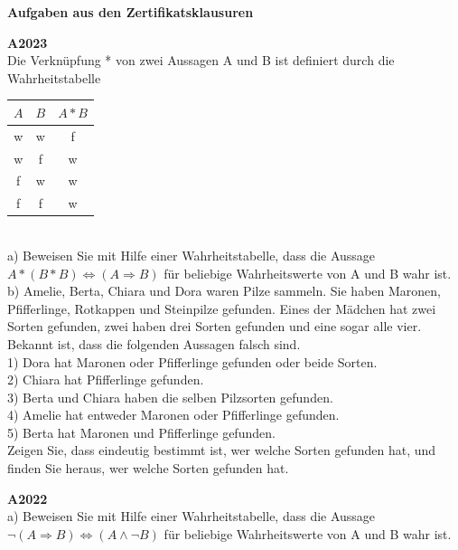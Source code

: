 \documentclass[landscape,twocolumn,a4paper]{article}
\begin{document}
\parindent 0mm

\textbf{Aufgaben aus den Zertifikatsklausuren}

\bigskip

\textbf{A2023} \\

Die Verknüpfung * von zwei Aussagen A und B ist definiert durch die Wahrheitstabelle \\

\begin{tabular}{|c|c|c|}
\hline $A$ & $B$ & $A * B$  \\
\hline w & w & f  \\
\hline w & f & w \\
\hline f & w & w \\
\hline f & f & w  \\
\hline
\end{tabular} \\

a) Beweisen Sie mit Hilfe einer Wahrheitstabelle, dass die Aussage $ A * (B * B) \Leftrightarrow (A \Rightarrow B)$ für beliebige Wahrheitswerte von A und B wahr ist. \\

b) Amelie, Berta, Chiara und Dora waren Pilze sammeln. Sie haben Maronen, Pfifferlinge, Rotkappen
und Steinpilze gefunden. Eines der Mädchen hat zwei Sorten gefunden, zwei haben
drei Sorten gefunden und eine sogar alle vier. \\
Bekannt ist, dass die folgenden Aussagen falsch sind. \\
1) Dora hat Maronen oder Pfifferlinge gefunden oder beide Sorten. \\
2) Chiara hat Pfifferlinge gefunden. \\
3) Berta und Chiara haben die selben Pilzsorten gefunden. \\
4) Amelie hat entweder Maronen oder Pfifferlinge gefunden. \\
5) Berta hat Maronen und Pfifferlinge gefunden. \\ 
Zeigen Sie, dass eindeutig bestimmt ist, wer welche Sorten gefunden hat, und finden Sie heraus,
wer welche Sorten gefunden hat.

\bigskip

\textbf{A2022} \\

a) Beweisen Sie mit Hilfe einer Wahrheitstabelle, dass die Aussage $ \lnot(A \Rightarrow B) \Leftrightarrow (A \land \lnot B)$ für beliebige Wahrheitswerte von A und B wahr ist. \\
\end{document}
